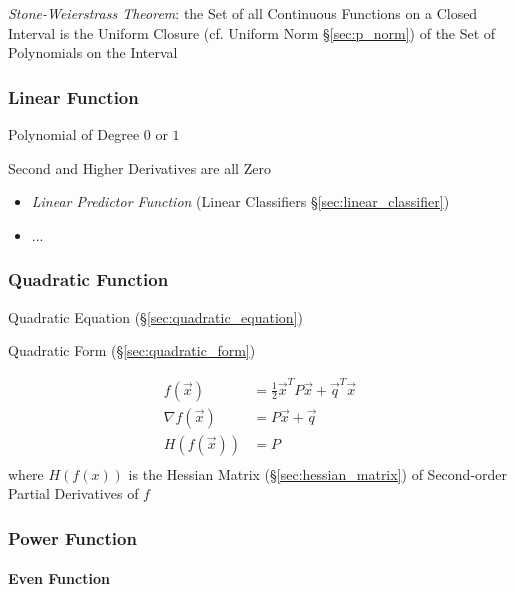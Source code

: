 \emph{Stone-Weierstrass Theorem}: the Set of all Continuous Functions on a
Closed Interval is the Uniform Closure (cf. Uniform Norm \S\ref{sec:p_norm}) of
the Set of Polynomials on the Interval



\subsubsection{Linear Function}\label{sec:linear_function}

Polynomial of Degree $0$ or $1$

Second and Higher Derivatives are all Zero

\begin{itemize}
  \item \emph{Linear Predictor Function} (Linear Classifiers
    \S\ref{sec:linear_classifier})
  \item ...
\end{itemize}



\subsubsection{Quadratic Function}\label{sec:quadratic_function}

\fist Quadratic Equation (\S\ref{sec:quadratic_equation})

\fist Quadratic Form (\S\ref{sec:quadratic_form})

\begin{align*}
  f(\vec{x})        & = \frac{1}{2}\vec{x}^T P \vec{x} + \vec{q}^T\vec{x} \\
  \nabla f(\vec{x}) & = P\vec{x} + \vec{q} \\
  H(f(\vec{x}))     & = P \\
\end{align*}
where $H(f(x))$ is the Hessian Matrix (\S\ref{sec:hessian_matrix}) of
Second-order Partial Derivatives of $f$



\subsubsection{Power Function}\label{sec:power_function}


\paragraph{Even Function}\label{sec:even_function}\hfill

